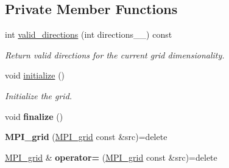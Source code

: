 \subsection*{Private Member Functions}
\begin{DoxyCompactItemize}
\item 
int \hyperlink{classsddk_1_1_m_p_i__grid_ae0e2ac9c19dc7657ae6ebb030be3b676}{valid\+\_\+directions} (int directions\+\_\+\+\_\+) const 
\begin{DoxyCompactList}\small\item\em Return valid directions for the current grid dimensionality. \end{DoxyCompactList}\item 
void \hyperlink{classsddk_1_1_m_p_i__grid_a08e7ce8736746de83044b988fb6801f8}{initialize} ()
\begin{DoxyCompactList}\small\item\em Initialize the grid. \end{DoxyCompactList}\item 
\hypertarget{classsddk_1_1_m_p_i__grid_aaacacdcc8fe94dc3508b0fdc40fda38b}{}void {\bfseries finalize} ()\label{classsddk_1_1_m_p_i__grid_aaacacdcc8fe94dc3508b0fdc40fda38b}

\item 
\hypertarget{classsddk_1_1_m_p_i__grid_a3624ca0e267269381ffc444873a0466c}{}{\bfseries M\+P\+I\+\_\+grid} (\hyperlink{classsddk_1_1_m_p_i__grid}{M\+P\+I\+\_\+grid} const \&src)=delete\label{classsddk_1_1_m_p_i__grid_a3624ca0e267269381ffc444873a0466c}

\item 
\hypertarget{classsddk_1_1_m_p_i__grid_a3f7cc2d879b39dc06b87f8d8cf388368}{}\hyperlink{classsddk_1_1_m_p_i__grid}{M\+P\+I\+\_\+grid} \& {\bfseries operator=} (\hyperlink{classsddk_1_1_m_p_i__grid}{M\+P\+I\+\_\+grid} const \&src)=delete\label{classsddk_1_1_m_p_i__grid_a3f7cc2d879b39dc06b87f8d8cf388368}

\end{DoxyCompactItemize}
